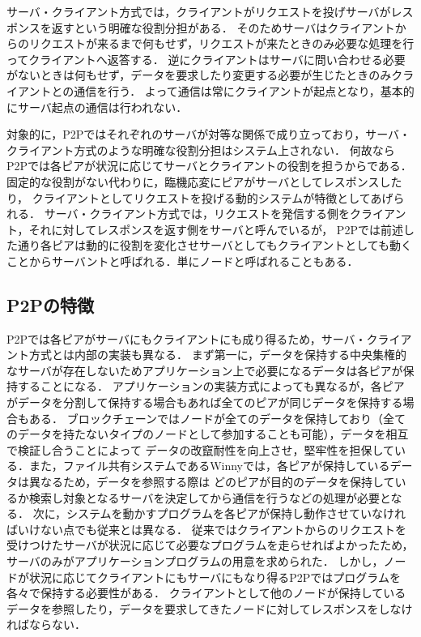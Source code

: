 サーバ・クライアント方式では，クライアントがリクエストを投げサーバがレスポンスを返すという明確な役割分担がある．
そのためサーバはクライアントからのリクエストが来るまで何もせず，リクエストが来たときのみ必要な処理を行ってクライアントへ返答する．
逆にクライアントはサーバに問い合わせる必要がないときは何もせず，データを要求したり変更する必要が生じたときのみクライアントとの通信を行う．
よって通信は常にクライアントが起点となり，基本的にサーバ起点の通信は行われない．

対象的に，P2Pではそれぞれのサーバが対等な関係で成り立っており，サーバ・クライアント方式のような明確な役割分担はシステム上されない．
何故ならP2Pでは各ピアが状況に応じてサーバとクライアントの役割を担うからである．固定的な役割がない代わりに，臨機応変にピアがサーバとしてレスポンスしたり，
クライアントとしてリクエストを投げる動的システムが特徴としてあげられる．
サーバ・クライアント方式では，リクエストを発信する側をクライアント，それに対してレスポンスを返す側をサーバと呼んでいるが，
P2Pでは前述した通り各ピアは動的に役割を変化させサーバとしてもクライアントとしても動くことからサーバントと呼ばれる．単にノードと呼ばれることもある．

\subsection{P2Pの特徴}

P2Pでは各ピアがサーバにもクライアントにも成り得るため，サーバ・クライアント方式とは内部の実装も異なる．
まず第一に，データを保持する中央集権的なサーバが存在しないためアプリケーション上で必要になるデータは各ピアが保持することになる．
アプリケーションの実装方式によっても異なるが，各ピアがデータを分割して保持する場合もあれば全てのピアが同じデータを保持する場合もある．
ブロックチェーンではノードが全てのデータを保持しており（全てのデータを持たないタイプのノードとして参加することも可能），データを相互で検証し合うことによって
データの改竄耐性を向上させ，堅牢性を担保している．また，ファイル共有システムであるWinnyでは，各ピアが保持しているデータは異なるため，データを参照する際は
どのピアが目的のデータを保持しているか検索し対象となるサーバを決定してから通信を行うなどの処理が必要となる．
次に，システムを動かすプログラムを各ピアが保持し動作させていなければいけない点でも従来とは異なる．
従来ではクライアントからのリクエストを受けつけたサーバが状況に応じて必要なプログラムを走らせればよかったため，サーバのみがアプリケーションプログラムの用意を求められた．
しかし，ノードが状況に応じてクライアントにもサーバにもなり得るP2Pではプログラムを各々で保持する必要性がある．
クライアントとして他のノードが保持しているデータを参照したり，データを要求してきたノードに対してレスポンスをしなければならない．

